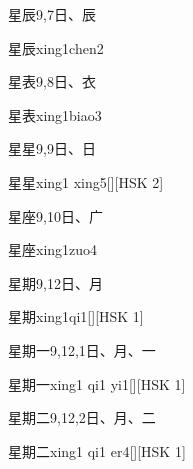 \begin{entry}{星辰}{9,7}{⽇、⾠}
  \begin{phonetics}{星辰}{xing1chen2}
  \end{phonetics}
\end{entry}

\begin{entry}{星表}{9,8}{⽇、⾐}
  \begin{phonetics}{星表}{xing1biao3}
  \end{phonetics}
\end{entry}

\begin{entry}{星星}{9,9}{⽇、⽇}
  \begin{phonetics}{星星}{xing1 xing5}[][HSK 2]
  \end{phonetics}
\end{entry}

\begin{entry}{星座}{9,10}{⽇、⼴}
  \begin{phonetics}{星座}{xing1zuo4}
  \end{phonetics}
\end{entry}

\begin{entry}{星期}{9,12}{⽇、⽉}
  \begin{phonetics}{星期}{xing1qi1}[][HSK 1]
  \end{phonetics}
\end{entry}

\begin{entry}{星期一}{9,12,1}{⽇、⽉、⼀}
  \begin{phonetics}{星期一}{xing1 qi1 yi1}[][HSK 1]
  \end{phonetics}
\end{entry}

\begin{entry}{星期二}{9,12,2}{⽇、⽉、⼆}
  \begin{phonetics}{星期二}{xing1 qi1 er4}[][HSK 1]
  \end{phonetics}
\end{entry}

